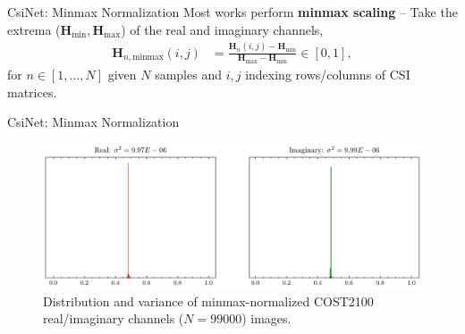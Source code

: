 \documentclass{beamer}
\begin{document}
  \begin{frame}{CsiNet: Minmax Normalization}
    Most works perform \textbf{minmax scaling} -- Take the extrema ($\mathbf H_{\text{min}}, \mathbf H_{\text{max}}$) of the real and imaginary channels, 
    \begin{align*}
      \mathbf H_{n,\text{minmax}}(i,j) &= \frac{\mathbf H_n(i,j)-\mathbf H_{\text{min}}}{\mathbf H_{\text{max}}-\mathbf H_{\text{min}}} \in [0,1],
    \end{align*}
    for $n \in [1,\dots,N]$ given $N$ samples and $i,j$ indexing rows/columns of CSI matrices.
  \end{frame}

    \begin{frame}{CsiNet: Minmax Normalization}
      \begin{figure}[htb]
        \centering
        \includegraphics[width=.9\textwidth]{cost2100_indoor_dist.pdf}
        \medskip
        \caption{Distribution and variance of minmax-normalized COST2100 real/imaginary channels ($N=99000$) images.}
        \label{fig:cost_indoor_dist}
      \end{figure}
    \end{frame}
\end{document}
